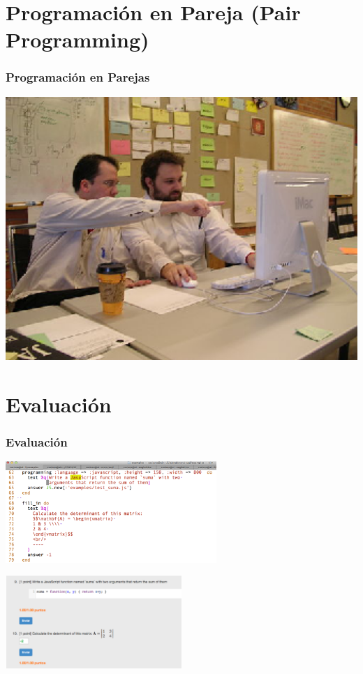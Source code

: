 \documentclass{beamer}
\begin{document}
\section{Programación en Pareja (Pair Programming)}
\begin{frame}
\frametitle{Programación en Parejas}
\includegraphics[width=1.0\textwidth]{img/pair_programming_1.eps}
\end{frame}


\section{Evaluación}
\begin{frame}
\frametitle{Evaluación}

\begin{center}
    \includegraphics[width=0.6\textwidth]{img/ruqlsrc.eps}

    \includegraphics[width=0.5\textwidth]{img/ruqlbrowser.eps}
\end{center}
\end{frame}
\end{document}
